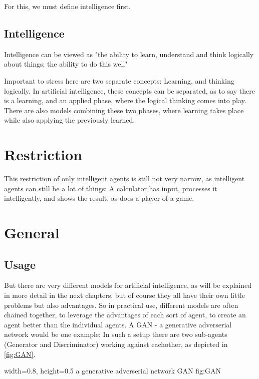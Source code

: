 For this, we must define intelligence first.
\subsection{Intelligence}
Intelligence can be viewed as "the ability to learn, understand and think logically about things; the ability to do this well" 

Important to stress here are two separate concepts: Learning, and thinking logically.
In artificial intelligence, these concepts can be separated, as to say there is a learning, and an applied phase, where the logical thinking comes into play. %
There are also models combining these two phases, where learning takes place while also applying the previously learned. 

\section{Restriction}
This restriction of only intelligent agents is still not very narrow, as intelligent agents can still be a lot of things: A calculator has input, processes it intelligently, and shows the result, as does a player of a game.


\section{General}
\subsection{Usage}
But there are very different models for artificial intelligence, as will be explained in more detail in the next chapters, but of course they all have their own little problems but also advantages. So in practical use, different models are often chained together, to leverage the advantages of each sort of agent, to create an agent better than the individual agents. %
A GAN - a generative adverserial network would be one example: In such a setup there are two sub-agents (Generator and Discriminator) working against eachother, as depicted in \ref{fig:GAN}.

    {width=0.8\textwidth, height=0.5\textheight} %
    {a generative adverserial network}   %
    {GAN}   %
    {fig:GAN}    %


